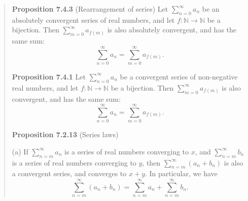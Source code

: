\documentclass{article}
\begin{document}
\begin{quotation}
    \textbf{Proposition 7.4.3} (Rearrangement of series) Let $\sum_{n=0}^{\infty} a_n$
    be an absolutely convergent series of real numbers, and let $f: \mathbb{N} \to \mathbb{N}$
    be a bijection.
    Then $\sum_{m=0}^{\infty} a_{f(m)}$ is also absolutely convergent, and has the
    same sum:
    \[
        \sum_{n=0}^{\infty} a_n = \sum_{m=0}^{\infty} a_{f(m)}.
    \]

    \textbf{Proposition 7.4.1} Let $\sum_{n=0}^{\infty} a_n$ be a convergent series
    of non-negative real numbers, and let $f: \mathbb{N} \to \mathbb{N}$ be a bijection.
    Then $\sum_{m=0}^{\infty} a_{f(m)}$ is also convergent, and has the same sum:
    \[
        \sum_{n=0}^{\infty} a_n = \sum_{m=0}^{\infty} a_{f(m)}.
    \]

    \textbf{Proposition 7.2.13} (Series laws)

    (a) If $\sum_{n=m}^{\infty} a_n$ is a series of real numbers converging to $x$,
    and $\sum_{n=m}^{\infty} b_n$ is a series of real numbers converging to $y$, then
    $\sum_{n=m}^{\infty} (a_n + b_n)$ is also a convergent series, and converges to $x + y$.
    In particular, we have
    \[
        \sum_{n=m}^{\infty} (a_n + b_n) = \sum_{n=m}^{\infty} a_n + \sum_{n=m}^{\infty} b_n.
    \]
\end{quotation}
\end{document}
